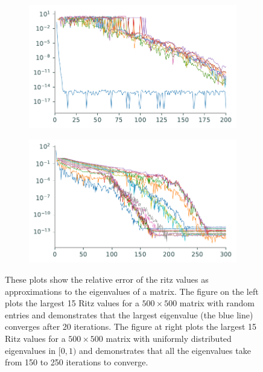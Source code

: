 \begin{figure}
\centering
\begin{subfigure}[b]{.49\textwidth}
    \centering
    \includegraphics[width=\textwidth]{figures/rand_vals_conv.pdf}
    \caption{}
    \label{fig:arnoldi_random_val_conv}
\end{subfigure}
\begin{subfigure}[b]{.49\textwidth}
    \centering
    \includegraphics[width=\textwidth]{figures/rand_eigs_conv.pdf}
    \caption{}
    \label{fig:arnoldi_random_eig_conv}
\end{subfigure}
\caption{These plots show the relative error of the ritz values as approximations to the eigenvalues of a matrix.
The figure on the left plots the largest 15 Ritz values for a $500\times 500$ matrix with random entries and demonstrates that the largest eigenvalue (the blue line) converges after 20 iterations.
The figure at right plots the largest 15 Ritz values for a $500\times 500$ matrix with uniformly distributed eigenvalues in $[0,1)$ and demonstrates that all the eigenvalues take from 150 to 250 iterations to converge.}
\end{figure}

